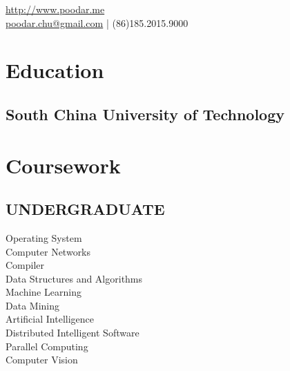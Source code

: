 \documentclass[]{deedy-resume-openfont}
\begin{document}
%
%

%
%


 { %
	\url{http://www.poodar.me} \\
	\href{mailto:poodarchu@gmail.com}{poodar.chu@gmail.com} | (86)185.2015.9000 %
}

%
%

\begin{minipage}[t]{0.30\textwidth} 


\section{Education} 

\subsection{South China University of Technology}

\sectionsep


\section{Coursework}

\subsection{UNDERGRADUATE}
Operating System \\
Computer Networks \\
Compiler \\
Data Structures and Algorithms \\
Machine Learning \\
Data Mining \\
Artificial Intelligence\\
Distributed Intelligent Software \\
Parallel Computing \\
Computer Vision


\end{minipage}
\end{document}
